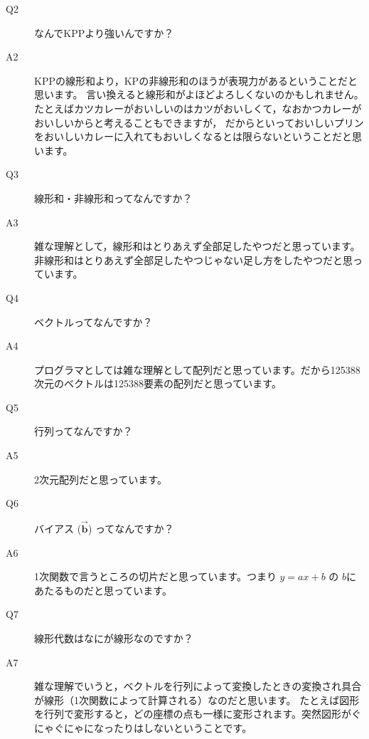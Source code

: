 \documentclass[11pt,a4paper]{ltjsarticle}
\begin{document}
\begin{description}
  \item[Q2] なんでKPPより強いんですか？
  \item[A2] KPPの線形和より，KPの非線形和のほうが表現力があるということだと思います。
  言い換えると線形和がよほどよろしくないのかもしれません。
  たとえばカツカレーがおいしいのはカツがおいしくて，なおかつカレーがおいしいからと考えることもできますが，
  だからといっておいしいプリンをおいしいカレーに入れてもおいしくなるとは限らないということだと思います。
\end{description}

\begin{description}
  \item[Q3] 線形和・非線形和ってなんですか？
  \item[A3] 雑な理解として，線形和はとりあえず全部足したやつだと思っています。非線形和はとりあえず全部足したやつじゃない足し方をしたやつだと思っています。
\end{description}

\begin{description}
  \item[Q4] ベクトルってなんですか？
  \item[A4] プログラマとしては雑な理解として配列だと思っています。だから125388次元のベクトルは125388要素の配列だと思っています。
\end{description}

\begin{description}
  \item[Q5] 行列ってなんですか？
  \item[A5] 2次元配列だと思っています。
\end{description}

\begin{description}
  \item[Q6] バイアス ($\vec{\bm{b}}$) ってなんですか？
  \item[A6] 1次関数で言うところの切片だと思っています。つまり $y = ax + b$ の $b$にあたるものだと思っています。
\end{description}

\begin{description}
  \item[Q7] 線形代数はなにが線形なのですか？
  \item[A7] 雑な理解でいうと，ベクトルを行列によって変換したときの変換され具合が線形（1次関数によって計算される）なのだと思います。
  たとえば図形を行列で変形すると，どの座標の点も一様に変形されます。突然図形がぐにゃぐにゃになったりはしないということです。
\end{description}
\end{document}
